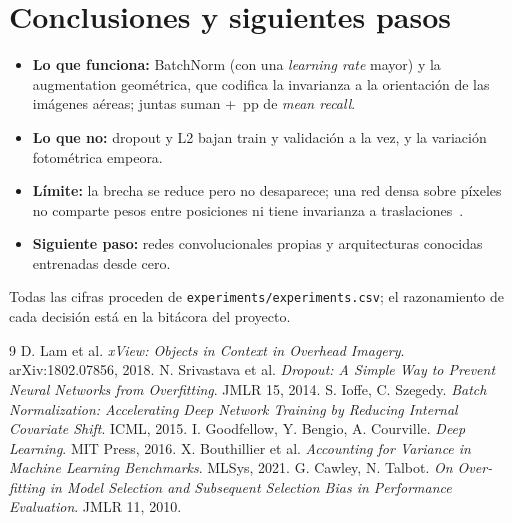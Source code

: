 \section{Conclusiones y siguientes pasos}
\begin{itemize}
  \item \textbf{Lo que funciona:} BatchNorm (con una \emph{learning rate} mayor) y la augmentation geométrica, que
  codifica la invarianza a la orientación de las imágenes aéreas; juntas suman +~pp de \emph{mean
  recall}.
  \item \textbf{Lo que no:} dropout y L2 bajan train y validación a la vez, y la variación fotométrica empeora.
  \item \textbf{Límite:} la brecha se reduce pero no desaparece; una red densa sobre píxeles no comparte pesos entre
  posiciones ni tiene invarianza a traslaciones~\cite{goodfellow}.
  \item \textbf{Siguiente paso:} redes convolucionales propias y arquitecturas conocidas entrenadas desde cero.
\end{itemize}

Todas las cifras proceden de \texttt{experiments/experiments.csv}; el razonamiento de cada decisión está en la
bitácora del proyecto.

\begin{thebibliography}{9}\small
{} D. Lam et al. \emph{xView: Objects in Context in Overhead Imagery}. arXiv:1802.07856, 2018.
 N. Srivastava et al. \emph{Dropout: A Simple Way to Prevent Neural Networks from Overfitting}. JMLR 15, 2014.
 S. Ioffe, C. Szegedy. \emph{Batch Normalization: Accelerating Deep Network Training by Reducing Internal Covariate Shift}. ICML, 2015.
 I. Goodfellow, Y. Bengio, A. Courville. \emph{Deep Learning}. MIT Press, 2016.
 X. Bouthillier et al. \emph{Accounting for Variance in Machine Learning Benchmarks}. MLSys, 2021.
 G. Cawley, N. Talbot. \emph{On Over-fitting in Model Selection and Subsequent Selection Bias in Performance Evaluation}. JMLR 11, 2010.
\end{thebibliography}
